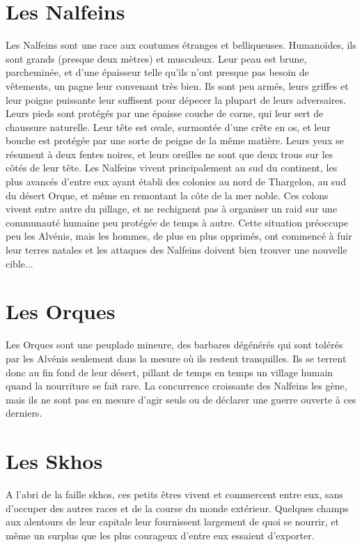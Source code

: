 \section{Les Nalfeins}
Les Nalfeins sont une race aux coutumes étranges et belliqueuses. Humanoïdes, ils sont grands (presque deux mètres) et musculeux. Leur peau est brune, parcheminée, et d'une épaisseur telle qu'ils n'ont presque pas besoin de vêtements, un pagne leur convenant très bien. Ils sont peu armés, leurs griffes et leur poigne puissante leur suffisent pour dépecer la plupart de leurs adversaires. Leurs pieds sont protégés par une épaisse couche de corne, qui leur sert de chaussure naturelle. Leur tête est ovale, surmontée d'une crête en os, et leur bouche est protégée par une sorte de peigne de la même matière. Leurs yeux se résument à deux fentes noires, et leurs oreilles ne sont que deux trous sur les côtés de leur tête. Les Nalfeins vivent principalement au sud du continent, les plus avancés d'entre eux ayant établi des colonies au nord de Thargelon, au sud du désert Orque, et même en remontant la côte de la mer noble. Ces colons vivent entre autre du pillage, et ne rechignent pas à organiser un raid sur une communauté humaine peu protégée de temps à autre. Cette situation préoccupe peu les Alvénis, mais les hommes, de plus en plus opprimés, ont commencé à fuir leur terres natales et les attaques des Nalfeins doivent bien trouver une nouvelle cible...

\section{Les Orques}
Les Orques sont une peuplade mineure, des barbares dégénérés qui sont tolérés par les Alvénis seulement dans la mesure où ils restent tranquilles. Ils se terrent donc au fin fond de leur désert, pillant de temps en temps un village humain quand la nourriture se fait rare. La concurrence croissante des Nalfeins les gène, mais ils ne sont pas en mesure d'agir seuls ou de déclarer une guerre ouverte à ces derniers.

\section{Les Skhos}
A l'abri de la faille skhos, ces petits êtres vivent et commercent entre eux, sans d'occuper des autres races et de la course du monde extérieur. Quelques champs aux alentours de leur capitale leur fournissent largement de quoi se nourrir, et même un surplus que les plus courageux d'entre eux essaient d'exporter.

